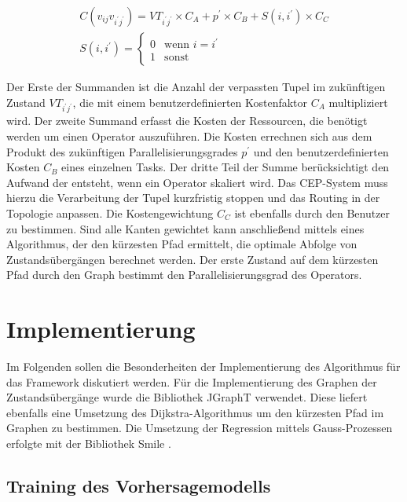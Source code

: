 \begin{equation*}
\begin{split}
C(v_{ij}v_{i^\prime j^\prime}) = VT_{i^\prime j^\prime} \times  C_A + p^\prime \times C_B + S(i,i^\prime) \times C_C \\
   S(i,i^\prime) =
   \begin{cases}
     0 & \text{wenn } i = i^\prime \\
     1 & \text{sonst} 
   \end{cases}
\end{split}
\end{equation*}


Der Erste der Summanden ist die Anzahl der verpassten Tupel im zukünftigen Zustand \(VT_{i^\prime j^\prime}\), die mit einem benutzerdefinierten Kostenfaktor \(C_A\) multipliziert wird.
Der zweite Summand erfasst die Kosten der Ressourcen, die benötigt werden um einen Operator auszuführen.
Die Kosten errechnen sich aus dem Produkt des zukünftigen Parallelisierungsgrades \(p^\prime\) und den benutzerdefinierten Kosten \(C_B\) eines einzelnen Tasks.
Der dritte Teil der Summe berücksichtigt den Aufwand der entsteht, wenn ein Operator skaliert wird.
Das CEP-System muss hierzu die Verarbeitung der Tupel kurzfristig stoppen und das Routing in der Topologie anpassen.
Die Kostengewichtung \(C_C\) ist ebenfalls durch den Benutzer zu bestimmen.
Sind alle Kanten gewichtet kann anschließend mittels eines Algorithmus, der den kürzesten Pfad ermittelt, die optimale Abfolge von Zustandsübergängen berechnet werden.
Der erste Zustand auf dem kürzesten Pfad durch den Graph bestimmt den Parallelisierungsgrad des Operators.

\section{Implementierung}

Im Folgenden sollen die Besonderheiten der Implementierung des Algorithmus für das Framework diskutiert werden.
Für die Implementierung des Graphen der Zustandsübergänge wurde die Bibliothek JGraphT \cite{noauthor_welcome_nodate} verwendet.
Diese liefert ebenfalls eine Umsetzung des Dijkstra-Algorithmus um den kürzesten Pfad im Graphen zu bestimmen.
Die Umsetzung der Regression mittels Gauss-Prozessen erfolgte mit der Bibliothek Smile \cite{noauthor_smile_nodate}.

\subsection{Training des Vorhersagemodells}

